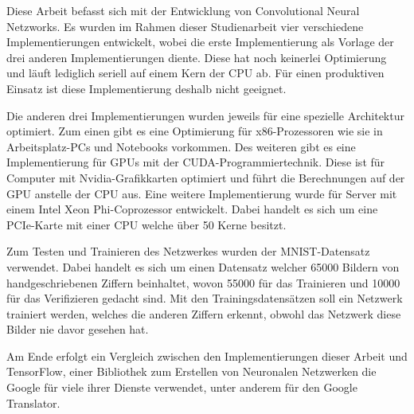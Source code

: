 \documentclass[../main.tex]{subfiles}
\begin{document}
Diese Arbeit befasst sich mit der Entwicklung von Convolutional Neural Netzworks. Es wurden im Rahmen dieser Studienarbeit vier verschiedene Implementierungen entwickelt, wobei die erste Implementierung als Vorlage der drei anderen Implementierungen diente. Diese hat noch keinerlei Optimierung und läuft lediglich seriell auf einem Kern der CPU ab. Für einen produktiven Einsatz ist diese Implementierung deshalb nicht geeignet.

Die anderen drei Implementierungen wurden jeweils für eine spezielle Architektur optimiert. Zum einen gibt es eine Optimierung für x86-Prozessoren wie sie in Arbeitsplatz-PCs und Notebooks vorkommen. Des weiteren gibt es eine Implementierung für GPUs mit der CUDA-Programmiertechnik. Diese ist für Computer mit Nvidia-Grafikkarten optimiert und führt die Berechnungen auf der GPU anstelle der CPU aus. Eine weitere Implementierung wurde für Server mit einem Intel Xeon Phi-Coprozessor entwickelt. Dabei handelt es sich um eine PCIe-Karte mit einer CPU welche über 50 Kerne besitzt.

Zum Testen und Trainieren des Netzwerkes wurden der MNIST-Datensatz verwendet. Dabei handelt es sich um einen Datensatz welcher 65000 Bildern von handgeschriebenen Ziffern beinhaltet, wovon 55000 für das Trainieren und 10000 für das Verifizieren gedacht sind. Mit den Trainingsdatensätzen soll ein Netzwerk trainiert werden, welches die anderen Ziffern erkennt, obwohl das Netzwerk diese Bilder nie davor gesehen hat.

Am Ende erfolgt ein Vergleich zwischen den Implementierungen dieser Arbeit und TensorFlow, einer Bibliothek zum Erstellen von Neuronalen Netzwerken die Google für viele ihrer Dienste verwendet, unter anderem für den Google Translator.
\end{document}
